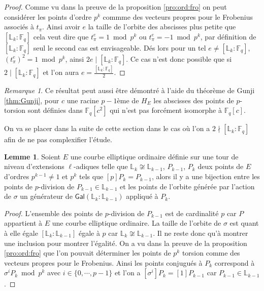 \documentclass[10pt,a4paper]{book}
\theoremstyle{plain}
\theoremstyle{definition}
\newtheorem{lem}[thm]{Lemme}
\theoremstyle{definition}
\theoremstyle{definition}
\theoremstyle{definition}
\theoremstyle{remark}
\newtheorem{rem}[thm]{Remarque}
\theoremstyle{remark}
\begin{document}
\begin{proof}
Comme vu dans la preuve de la proposition \ref{pro:ord:fro} on peut considérer les points d'ordre $p^k$ commme des vecteurs propres pour le Frobenius associés à $t_{\pi}$. Ainsi avoir $e$ la taille de l'orbite des abscisses plus petite que  $[\mathbb{L}_k:\mathbb{F}_q]$ cela veut dire que $t_{\pi}^e=1 \bmod p^k$ ou $t_{\pi}^e=-1 \bmod p^k$, par définition de $[\mathbb{L}_k:\mathbb{F}_q]$ seul le second cas est envisageable. Dés lors pour un tel $e \neq [\mathbb{L}_k:\mathbb{F}_q]$,  $(t_{\pi}^{e})^2=1 \bmod p^k$, ainsi $2e \mid [\mathbb{L}_k:\mathbb{F}_q]$. Ce cas n'est donc possible que si $2 \mid [\mathbb{L}_k:\mathbb{F}_q]$ et l'on aura $e= \frac{[\mathbb{L}_k:\mathbb{F}_q]}{2}$. 
\end{proof}


\begin{rem}
Ce résultat peut aussi être démontré à l'aide du théorème de Gunji \ref{thm:Gunji}, pour $c$ une racine $p-1$ème de $H_E$ les abscisses des points de $p$-torsion sont définies dans $\mathbb{F}_q[c^2]$ qui n'est pas forcément isomorphe à $\mathbb{F}_q[c]$.
\end{rem}

On va se placer dans la suite de cette section dans le cas où l'on a $2 \nmid [\mathbb{L}_k:\mathbb{F}_q]$ afin de ne pas complexifier l'étude.

\begin{lem}
\label{lem:bij:ord}
Soient $E$ une courbe elliptique ordinaire définie sur une tour de niveau d'extensions $\ell$-adiques telle que $\mathbb{L}_k \not \cong \mathbb{L}_{k-1}$, $P_{k-1}$, $P_k$ deux points de $E$ d'ordres $p^{k-1} \neq 1$ et $p^{k}$ tels que $[p]P_{k}=P_{k-1}$, alors il y a une bijection entre les points de $p$-division de $P_{k-1} \in \mathbb{L}_{k-1}$ et les points de l'orbite générée par l'action de $\sigma $ un générateur de $ \mathsf{Gal}(\mathbb{L}_k:\mathbb{L}_{k-1})$ appliqué à $P_{k}$.
\end{lem}

\begin{proof}
L'ensemble des points de $p$-division de $P_{k-1}$ est de cardinalité $p$ car $P$ appartient à $E$ une courbe elliptique ordinaire. La taille de l'orbite de $\sigma$ est quant à elle égale $[\mathbb{L}_k:\mathbb{L}_{k-1}]$ égale à $p$ car $\mathbb{L}_k \not \cong \mathbb{L}_{k-1}$. Il ne reste donc qu'à montrer une inclusion pour montrer l'égalité. On a vu dans la preuve de la proposition \ref{pro:ord:fro} que l'on pouvait déterminer les points de $p^k$ torsion comme des vecteurs propres pour le Frobenius. Ainsi les points conjugués à $P_k$ correspond à$\sigma^{i } P_{k} \bmod p^k$ avec $i \in \{0, \cdots , p-1  \}$ et l'on a $[\sigma^{i}]P_{k}=[1]P_{k-1}$ car $P_{k-1} \in \mathbb{L}_{k-1}$.
\end{proof}
\end{document}
